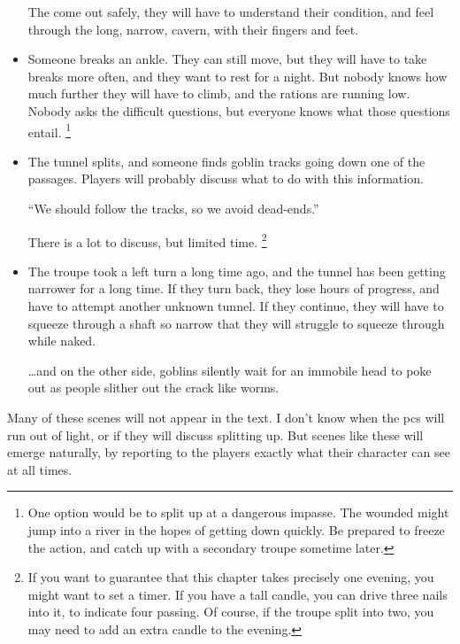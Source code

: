 \begin{multicols}{2}
\begin{itemize}
	The come out safely, they will have to understand their condition, and feel through the long, narrow, cavern, with their fingers and feet.
	\item
	Someone breaks an ankle.
	They can still move, but they will have to take breaks more often, and they want to rest for a night.
	But nobody knows how much further they will have to climb, and the rations are running low.
	Nobody asks the difficult questions, but everyone knows what those questions entail.%
	\footnote{One option would be to split up at a dangerous impasse.
	The wounded might jump into a river in the hopes of getting down quickly.
	Be prepared to freeze the action, and catch up with a secondary troupe sometime later.}
	\item
	The tunnel splits, and someone finds goblin tracks going down one of the passages.
	Players will probably discuss what to do with this information.
	\begin{speechtext}
		``We should follow the tracks, so we avoid dead-ends.''
	\end{speechtext}
	There is a lot to discuss, but limited time.%
	\footnote{If you want to guarantee that this chapter takes precisely one evening, you might want to set a timer.
	If you have a tall candle, you can drive three nails into it, to indicate four  passing.
	Of course, if the troupe split into two, you may need to add an extra candle to the evening.}
	\item
	The troupe took a left turn a long time ago, and the tunnel has been getting narrower for a long time.
	If they turn back, they lose hours of progress, and have to attempt another unknown tunnel.
	If they continue, they will have to squeeze through a shaft so narrow that they will struggle to squeeze through while naked.

	\ldots and on the other side, goblins silently wait for an immobile head to poke out as people slither out the crack like worms.
\end{itemize}

Many of these scenes will not appear in the text.
I don't know when the \glspl{pc} will run out of light, or if they will discuss splitting up.
But scenes like these will emerge naturally, by reporting to the players exactly what their character can see at all times.

\end{multicols}
